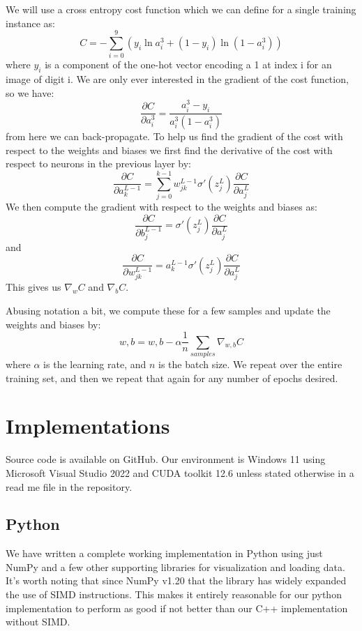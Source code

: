 \documentclass[sigconf,authorversion,nonacm]{acmart}
\begin{document}
We will use a cross entropy cost function \cite{entropy-cost-f} which we can define for a single training instance as:
\begin{equation}
    C = -\sum_{i=0}^9(y_i\ln{a^3_i}+(1-y_i)\ln(1-a^3_i))
\end{equation}
where $y_i$ is a component of the one-hot vector encoding a 1 at index i for an image of digit i. We are only ever interested in the gradient of the cost function, so we have:
\begin{equation}
    \frac{\partial C}{\partial a^3_i} = \frac{a_i^3-y_i}{a_i^3(1-a_i^3)}
\end{equation}
from here we can back-propagate. To help us find the gradient of the cost with respect to the weights and biases we first find the derivative of the cost with respect to neurons in the previous layer by:
\begin{equation}
    \frac{\partial C}{\partial a^{L-1}_k} = \sum_{j=0}^{k-1} w^{L-1}_{jk} \sigma'(z^L_j) \frac{\partial C}{\partial a^{L}_j}
\end{equation}
We then compute the gradient with respect to the weights and biases as:
\begin{equation}
    \frac{\partial C}{\partial b^{L-1}_{j}} = \sigma'(z^L_j) \frac{\partial C}{\partial a^{L}_j}
\end{equation}
and
\begin{equation}
    \frac{\partial C}{\partial w^{L-1}_{jk}} = a^{L-1}_k \sigma'(z^L_j) \frac{\partial C}{\partial a^{L}_j}
\end{equation}
This gives us $\nabla_wC$ and $\nabla_bC$.

Abusing notation a bit, we compute these for a few samples and update the weights and biases by:
\begin{equation}
    w,b = w,b - \alpha \frac{1}{n}\sum_{samples}\nabla_{w,b}C
\end{equation}
where $\alpha$ is the learning rate, and $n$ is the batch size. We repeat over the entire training set, and then we repeat that again for any number of epochs desired.

\section{Implementations}
Source code is available on GitHub\cite{CSC586C_Project}. Our environment is Windows 11 using Microsoft Visual Studio 2022 and CUDA toolkit 12.6 unless stated otherwise in a read me file in the repository.

\subsection{Python}
We have written a complete working implementation in Python using just NumPy and a few other supporting libraries for visualization and loading data. It's worth noting that since NumPy v1.20 that the library has widely expanded the use of SIMD instructions\cite{NumPyNotes}. This makes it entirely reasonable for our python implementation to perform as good if not better than our C++ implementation without SIMD.
\end{document}
